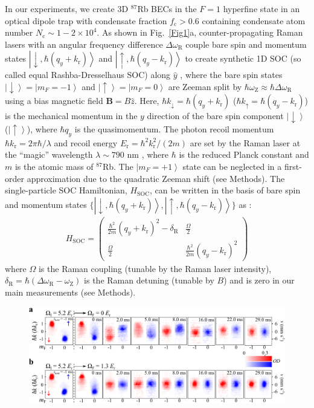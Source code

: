 \documentclass[showpacs,preprintnumbers,amsmath,amssymb, superscriptaddress, aps, reprint]{revtex4-1}
\def\E_r{E_{\text{r}}}
\def\k_r{k_{\text{r}}}
\def\deltaR{\delta_{\text{R}}}
\def\omegaR{\omega_{\text{R}}}
\def\omegaZ{\omega_{\text{Z}}}
\begin{document}
{In our experiments, we create 3D $^{87}$Rb BECs in the $F=1$ hyperfine state in an optical dipole trap with condensate fraction $f_{\text{c}}>0.6$ containing condensate atom number $N_{\text{c}}\sim 1-2\times 10^4$. As shown in Fig.~\ref{Fig1}a, counter-propagating Raman lasers with an angular frequency difference $\Delta \omegaR$ couple bare spin and momentum states $\left| \downarrow, \hbar(q_y + \k_r) \right\rangle$ and $\left| \uparrow,\hbar(q_y - \k_r) \right\rangle$ to create synthetic 1D SOC (so called equal Rashba-Dresselhaus SOC) along $\hat{y}$ \cite{Olson_LZ_PhysRevA2014}, where the bare spin states $\left| \downarrow \right\rangle  = \left|m_F=- 1 \right\rangle$ and $\left| \uparrow  \right\rangle =\left|m_F= 0\right\rangle$ are Zeeman split by $\hbar \omegaZ\approx \hbar \Delta \omegaR$ using a bias magnetic field $\textbf{B}=B\hat{z}$. Here, $\hbar k_{\downarrow}=\hbar(q_y+ \k_r)$ ($\hbar k_{\uparrow}=\hbar(q_y- \k_r)$) is the mechanical momentum in the $y$ direction of the bare spin component $\left| \downarrow \right\rangle$ ($\left| \uparrow \right\rangle$), where $\hbar q_y$ is the quasimomentum. The photon recoil momentum $\hbar \k_r=2\pi\hbar/\lambda$ and recoil energy $\E_r=\hbar ^2\k_r^2/(2m)$ are set by the Raman laser at the “magic” wavelength $\lambda\sim 790$ nm \cite{LeBlanc_magicWavelegnth_PRA}, where $\hbar$ is the reduced Planck constant and $m$ is the atomic mass of $^{87}$Rb. The $\left|m_F = + 1 \right\rangle$ state can be neglected in a first-order approximation due to the quadratic Zeeman shift ({see Methods}). The single-particle SOC Hamiltonian, $H_{\text{SOC}}$, can be written in the basis of bare spin and momentum states $\{\left| \downarrow, \hbar(q_y + \k_r) \right\rangle, \left| \uparrow,\hbar(q_y - \k_r) \right\rangle\}$ as \cite{Lin_SOC_Nature_2011}:
\begin{align}
\label{eq_hsoc}
H_{\text{SOC}}=
\begin{pmatrix}
\frac{\hbar^2}{2m}(q_y+\k_r)^2-\deltaR&\frac{\Omega}{2} \\ 
\frac{\Omega}{2} & \frac{\hbar^2}{2m}(q_y-\k_r)^2
\end{pmatrix}
\end{align}
where $\Omega$ is the Raman coupling (tunable by the Raman laser intensity), $\deltaR = \hbar (\Delta {\omegaR}-{\omegaZ})$ is the Raman detuning (tunable by $B$) and is zero in our main measurements ({see Methods}). 
\begin{figure}[!ht]
\centering
\includegraphics[width=6.9in]{Fig2_Vfinal.pdf}

\end{figure}}
\end{document}
